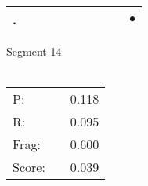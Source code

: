 \documentclass[landscape]{article}
\newcommand{\ssp}{\hspace{2pt}}
\newcommand{\mex}{\cellcolor{g}$\bullet$}
\begin{document}
\begin{tabular}{|l|p{10pt}|p{10pt}|p{10pt}|p{10pt}|p{10pt}|p{10pt}|p{10pt}|p{10pt}|p{10pt}|}
\hline
\ssp \cellcolor{ref8}. \ssp&\hspace{2pt}&\hspace{2pt}&\hspace{2pt}&\hspace{2pt}&\hspace{2pt}&\hspace{2pt}&\hspace{2pt}&\hspace{2pt}&\hspace{2pt}\mex\\
\hline
\end{tabular}

\vspace{6pt}
\noindent Segment 14\\\\
\noindent\begin{tabular}{lm{12pt}r}
\hline
P:&&0.118\\
R:&&0.095\\
Frag:&&0.600\\
Score:&&0.039\\
\end{tabular}

\newpage
\end{document}
